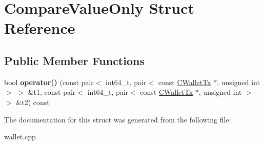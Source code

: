 \hypertarget{struct_compare_value_only}{}\section{Compare\+Value\+Only Struct Reference}
\label{struct_compare_value_only}
\subsection*{Public Member Functions}
\begin{DoxyCompactItemize}
\item 
\mbox{\label{struct_compare_value_only_a7ad5aa8e58f43537cbe5a5774e949bb0}} 
bool {\bfseries operator()} (const pair$<$ int64\+\_\+t, pair$<$ const \mbox{\hyperlink{class_c_wallet_tx}{C\+Wallet\+Tx}} $\ast$, unsigned int $>$ $>$ \&t1, const pair$<$ int64\+\_\+t, pair$<$ const \mbox{\hyperlink{class_c_wallet_tx}{C\+Wallet\+Tx}} $\ast$, unsigned int $>$ $>$ \&t2) const
\end{DoxyCompactItemize}


The documentation for this struct was generated from the following file\+:\begin{DoxyCompactItemize}
\item 
wallet.\+cpp\end{DoxyCompactItemize}

